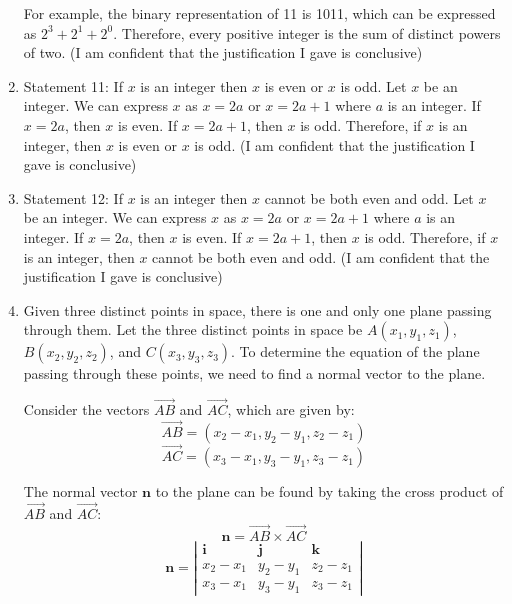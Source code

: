 \documentclass{article}
\begin{document}
\begin{enumerate}
          For example, the binary representation of 11 is 1011, which can be expressed as \(2^3 + 2^1 + 2^0\).\newline
          Therefore, every positive integer is the sum of distinct powers of two.\newline
          (I am confident that the justification I gave is conclusive)
    \item Statement 11: If $x$ is an integer then $x$ is even or $x$ is odd.\newline
          Let \(x\) be an integer. We can express \(x\) as \(x = 2a\) or \(x = 2a + 1\) where \(a\) is an integer.\newline
          If \(x = 2a\), then \(x\) is even. If \(x = 2a + 1\), then \(x\) is odd.\newline
          Therefore, if \(x\) is an integer, then \(x\) is even or \(x\) is odd.\newline
          (I am confident that the justification I gave is conclusive)
    \item Statement 12: If $x$ is an integer then $x$ cannot be both even and odd.\newline
          Let \(x\) be an integer. We can express \(x\) as \(x = 2a\) or \(x = 2a + 1\) where \(a\) is an integer.\newline
          If \(x = 2a\), then \(x\) is even. If \(x = 2a + 1\), then \(x\) is odd.\newline
          Therefore, if \(x\) is an integer, then \(x\) cannot be both even and odd.\newline
          (I am confident that the justification I gave is conclusive)
    \item Given three distinct points in space, there is one and only one plane passing through them.\newline
    Let the three distinct points in space be \(A(x_1, y_1, z_1)\), \(B(x_2, y_2, z_2)\), and \(C(x_3, y_3, z_3)\). To determine the equation of the plane passing through these points, we need to find a normal vector to the plane.

    Consider the vectors \(\overrightarrow{AB}\) and \(\overrightarrow{AC}\), which are given by:
    \[
    \overrightarrow{AB} = (x_2 - x_1, y_2 - y_1, z_2 - z_1)
    \]
    \[
    \overrightarrow{AC} = (x_3 - x_1, y_3 - y_1, z_3 - z_1)
    \]
    
    The normal vector \(\mathbf{n}\) to the plane can be found by taking the cross product of \(\overrightarrow{AB}\) and \(\overrightarrow{AC}\):
    \[
    \mathbf{n} = \overrightarrow{AB} \times \overrightarrow{AC}
    \]
    \[
    \mathbf{n} = \left|\begin{array}{ccc}
    \mathbf{i} & \mathbf{j} & \mathbf{k} \\
    x_2 - x_1 & y_2 - y_1 & z_2 - z_1 \\
    x_3 - x_1 & y_3 - y_1 & z_3 - z_1
    \end{array}\right|
    \]
    

\end{enumerate}
\end{document}
